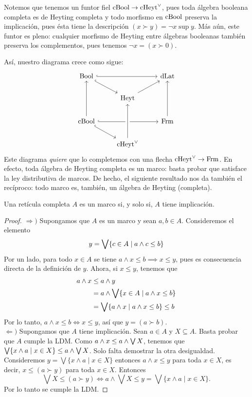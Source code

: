 Notemos que tenemos un funtor fiel $\mathrm{cBool}\to\mathrm{cHeyt}^\vee$, pues toda
álgebra booleana completa es de Heyting completa y todo
morfismo en $\mathrm{cBool}$ preserva la implicación, pues ésta tiene la
descripción $(x\succ y)=\neg x\sup y$.
Más aún, este funtor es pleno: cualquier morfismo de Heyting
entre álgebras booleanas también preserva los complementos, pues
tenemos $\neg x = (x\succ 0)$.

Así, nuestro diagrama crece como sigue:
\begin{equation}\label{diag:prisma-cheyt-incompleto}
\begin{tikzcd}
  \Bool \ar[dr,hook] \ar[rr,hook] &               & \DLat \\
                                  & \Heyt \ar[ur]         \\
  \CBA \ar[uu] \ar[rr,hook] \ar[dr,hook] & & \Frm \ar[uu]    \\
                            & \cHeyt \ar[uu,crossing over]
\end{tikzcd}
\end{equation}
Este diagrama \emph{quiere} que lo completemos con una flecha
$\mathrm{cHeyt}^\vee\to\mathrm{Frm}$. En efecto, toda álgebra de Heyting completa es un
marco: basta probar que satisface la ley distributiva de marcos. De
hecho, el siguiente resultado nos da también el recíproco: todo marco
es, también, un álgebra de Heyting (completa).

\begin{theorem}
  Una retícula completa $A$ es un marco si, y solo si, $A$ tiene
  implicación.
\end{theorem}
\begin{proof}
    $\Rightarrow )$ Supongamos que $A$ es un marco y sean $a,b\in A$.
    Consideremos el elemento
    $$y=\bigvee\{c\in A\mid a\wedge c\leq b\}$$
    Por un lado, para todo $x\in A$ se tiene
    $a\wedge x\leq b\implies x\leq y$,
    pues es consecuencia directa de la definición de $y$.
    Ahora, si $x\leq y$, tenemos que 
    \begin{align*}
        a\wedge x
        & \leq a\wedge y \\
        & = a\wedge\bigvee\{x\in A\mid a\wedge x\leq b\}\\
        & = \bigvee \{a\wedge x \mid a\wedge x\leq b\}\leq b
    \end{align*}
    Por lo tanto, $a\wedge x\leq b\Leftrightarrow x\leq y$,
    así que $y=(a\succ b)$. \\
    $\Leftarrow )$ Supongamos que $A$ tiene implicación.
    Sean $a\in A$ y $X\subseteq A$.
    Basta probar que $A$ cumple la LDM.
    Como $a\wedge x\leq a\wedge\bigvee X$, tenemos que
    $\bigvee\{x\wedge a\mid x\in X\}\leq a\wedge\bigvee X$.
    Solo falta demostrar la otra desigualdad. Consideremos $y=\bigvee\{x\wedge a\mid x\in X\}$
    entonces $a\wedge x\leq y$ para toda $x\in X$, es decir, $x\leq (a\succ y)$ para toda $x\in X$. 
    Entonces \[\bigvee X\leq (a\succ y)\Leftrightarrow a\wedge\bigvee X\leq y=\bigvee \{x\wedge a\mid x\in X\}.\] 
    Por lo tanto se cumple la LDM.
\end{proof}



